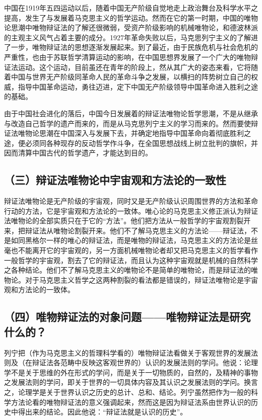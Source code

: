 中国在1919年五四运动以后，随着中国无产阶级自觉地走上政治舞台及科学水平之提高，发生了与发展着马克思主义的哲学运动。然而在它的第一时期，中国的唯物论思潮中唯物辩证法的了解还很微弱，受资产阶级影响的机械唯物论，和德波林派的主观主义风气占着主要的成分。1927年革命失败以后，马克思列宁主义的了解进了一步，唯物辩证法的思想逐渐发展起来。到了最近，由于民族危机与社会危机的严重性，也由于苏联哲学清算运动的影响，在中国思想界发展了一个广大的唯物辩证法运动。这个运动，目前虽还在青年的阶段上，然从其广大的姿态来看，它将随着中国与世界无产阶级同革命人民的革命斗争之发展，以横扫的阵势树立自己的权威，指导中国革命运动，勇往迈进，定下中国无产阶级领导中国革命进入胜利之途的基础。

由于中国社会进化的落后，中国今日发展着的辩证法唯物论哲学思潮，不是从继承与改造自己哲学的遗产而来的，而是从马克思列宁主义的学习而来的。然而要使辩证法唯物论思潮在中国深入与发展下去，并确定地指导中国革命向着彻底胜利之途，便必须同各种现存的反动哲学作斗争，在全国思想战线上树立批判的旗帜，并因而清算中国古代的哲学遗产，才能达到目的。

\subsection{（三）辩证法唯物论中宇宙观和方法论的一致性}

辩证法唯物论是无产阶级的宇宙观，同时又是无产阶级认识周围世界的方法和革命行动的方法，它是宇宙观和方法论的一致体。唯心论的马克思主义修正派认为辩证法唯物论的全部实质只在于它的“方法”。他们把方法从一般哲学的宇宙观割裂开来，把辩证法从唯物论割裂开来。他们不了解马克思主义的方法论——辩证法，不是如同黑格尔一样的唯心的辩证法，而是唯物的辩证法，马克思主义的方法论是丝毫也不能离开它的宇宙观的，另一方面机械唯物论者却又把马克思主义的哲学看作一般哲学的宇宙观，割去了它的辩证法，而且认为这种宇宙观就是机械的自然科学之各种结论。他们不了解马克思主义的唯物论不是简单的唯物论，而是辩证法的唯物论。对于马克思主义哲学之这两种割裂的看法都是错误的，辩证法唯物论是宇宙观和方法论的一致体。

\subsection{（四）唯物辩证法的对象问题——唯物辩证法是研究什么的？}

列宁把（作为马克思主义的哲理科学看的）唯物辩证法看做关于客观世界的发展法则及（在辩证法各范畴中反映这客观世界的）认识的发展法则的学问。他说：论理学不是关于思维的外在形式的学问，而是关于一切物质的，自然的，及精神的事物之发展法则的学问，即关于世界的一切具体内容及其认识之发展法则的学问。换言之，论理学是关于世界认识之历史的总计、总和、结论。列宁虽然把作为一般的科学方法论看的唯物辩证法的意义强调起来，然而这是因为辩证法系由世界认识的历史中得出来的结论。因此他说：“辩证法就是认识的历史”。

